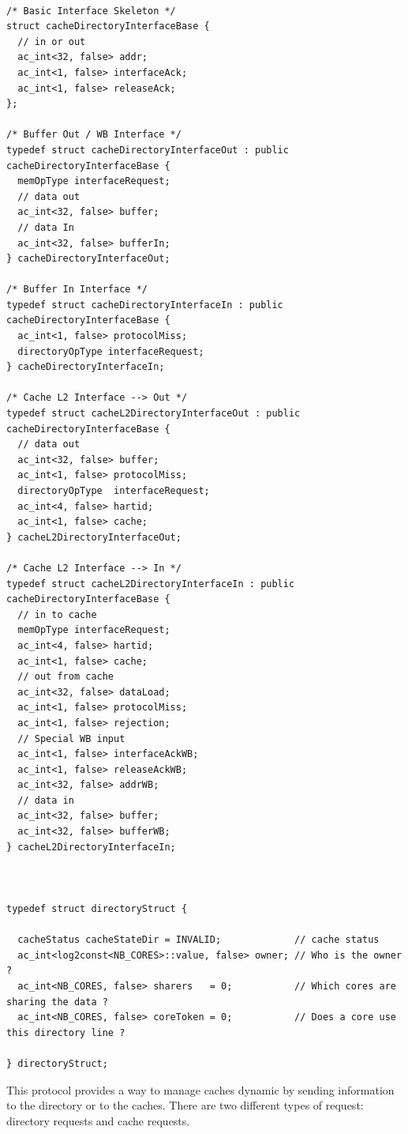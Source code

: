 \documentclass[10pt,letterpaper]{article}
\begin{document}
\begin{verbatim}

/* Basic Interface Skeleton */
struct cacheDirectoryInterfaceBase {
  // in or out
  ac_int<32, false> addr;
  ac_int<1, false> interfaceAck;
  ac_int<1, false> releaseAck;
};

/* Buffer Out / WB Interface */
typedef struct cacheDirectoryInterfaceOut : public cacheDirectoryInterfaceBase {
  memOpType interfaceRequest;
  // data out
  ac_int<32, false> buffer;
  // data In
  ac_int<32, false> bufferIn;
} cacheDirectoryInterfaceOut;

/* Buffer In Interface */
typedef struct cacheDirectoryInterfaceIn : public cacheDirectoryInterfaceBase {
  ac_int<1, false> protocolMiss;
  directoryOpType interfaceRequest;
} cacheDirectoryInterfaceIn;

/* Cache L2 Interface --> Out */
typedef struct cacheL2DirectoryInterfaceOut : public cacheDirectoryInterfaceBase {
  // data out
  ac_int<32, false> buffer;
  ac_int<1, false> protocolMiss;
  directoryOpType  interfaceRequest;
  ac_int<4, false> hartid;
  ac_int<1, false> cache;
} cacheL2DirectoryInterfaceOut;

/* Cache L2 Interface --> In */
typedef struct cacheL2DirectoryInterfaceIn : public cacheDirectoryInterfaceBase {
  // in to cache
  memOpType interfaceRequest;
  ac_int<4, false> hartid;
  ac_int<1, false> cache;
  // out from cache 
  ac_int<32, false> dataLoad;
  ac_int<1, false> protocolMiss;
  ac_int<1, false> rejection;
  // Special WB input
  ac_int<1, false> interfaceAckWB;
  ac_int<1, false> releaseAckWB;
  ac_int<32, false> addrWB;
  // data in
  ac_int<32, false> buffer;
  ac_int<32, false> bufferWB;
} cacheL2DirectoryInterfaceIn;



typedef struct directoryStruct {

  cacheStatus cacheStateDir = INVALID;             // cache status
  ac_int<log2const<NB_CORES>::value, false> owner; // Who is the owner ?
  ac_int<NB_CORES, false> sharers   = 0;           // Which cores are sharing the data ?
  ac_int<NB_CORES, false> coreToken = 0;           // Does a core use this directory line ?

} directoryStruct;
\end{verbatim}

This protocol provides a way to manage caches dynamic by sending information to the directory or to the caches. There are two different types of request: directory requests and cache requests.
\end{document}
